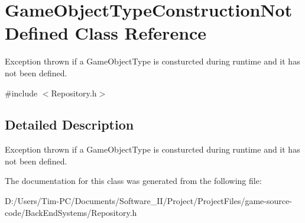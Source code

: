 \hypertarget{class_game_object_type_construction_not_defined}{}\section{Game\+Object\+Type\+Construction\+Not\+Defined Class Reference}
\label{class_game_object_type_construction_not_defined}


Exception thrown if a Game\+Object\+Type is consturcted during runtime and it has not been defined.  




{\ttfamily \#include $<$Repository.\+h$>$}



\subsection{Detailed Description}
Exception thrown if a Game\+Object\+Type is consturcted during runtime and it has not been defined. 

The documentation for this class was generated from the following file\+:\begin{DoxyCompactItemize}
\item 
D\+:/\+Users/\+Tim-\/\+P\+C/\+Documents/\+Software\+\_\+\+I\+I/\+Project/\+Project\+Files/game-\/source-\/code/\+Back\+End\+Systems/Repository.\+h\end{DoxyCompactItemize}
